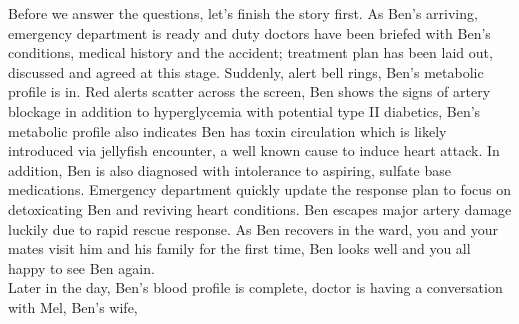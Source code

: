 Before we answer the questions, let's finish the story first. As Ben's arriving, emergency department is ready and duty doctors have been briefed with Ben's conditions, medical history and the accident; treatment plan has been laid out, discussed and agreed at this stage. Suddenly, alert bell rings, Ben's metabolic profile is in. Red alerts scatter across the screen, Ben shows the signs of artery blockage in addition to hyperglycemia with potential type II diabetics, Ben's metabolic profile also indicates Ben has toxin circulation which is likely introduced via jellyfish encounter, a well known cause to induce heart attack. In addition, Ben is also diagnosed with intolerance to aspiring, sulfate base medications. Emergency department quickly update the response plan to focus on  detoxicating Ben and reviving heart conditions. Ben escapes major artery damage luckily due to rapid rescue response. As Ben recovers in the ward, you and your mates visit him and his family for the first time, Ben looks well and you all happy to see Ben again.\\
Later in the day, Ben's blood profile is complete, doctor is having a conversation with Mel, Ben's wife, \\

